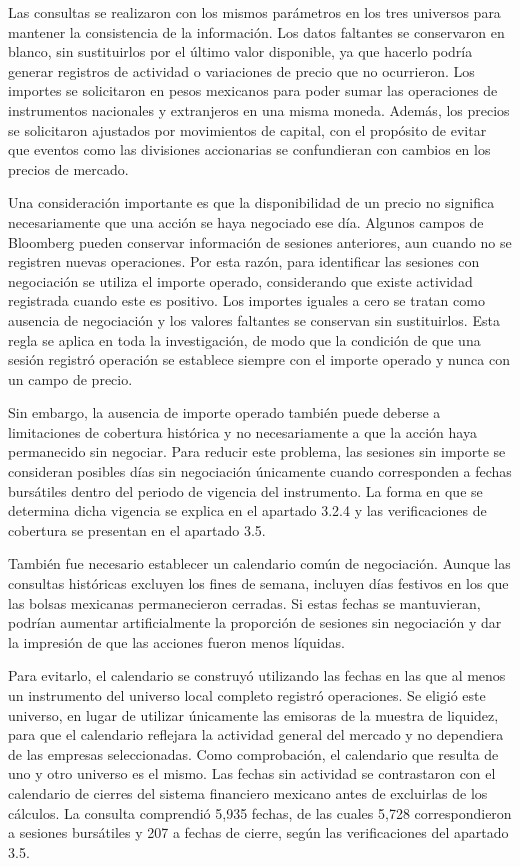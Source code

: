 Las consultas se realizaron con los mismos parámetros en los tres universos para mantener la consistencia de la información. Los datos faltantes se conservaron en blanco, sin sustituirlos por el último valor disponible, ya que hacerlo podría generar registros de actividad o variaciones de precio que no ocurrieron. Los importes se solicitaron en pesos mexicanos para poder sumar las operaciones de instrumentos nacionales y extranjeros en una misma moneda. Además, los precios se solicitaron ajustados por movimientos de capital, con el propósito de evitar que eventos como las divisiones accionarias se confundieran con cambios en los precios de mercado.

Una consideración importante es que la disponibilidad de un precio no significa necesariamente que una acción se haya negociado ese día. Algunos campos de Bloomberg pueden conservar información de sesiones anteriores, aun cuando no se registren nuevas operaciones. Por esta razón, para identificar las sesiones con negociación se utiliza el importe operado, considerando que existe actividad registrada cuando este es positivo. Los importes iguales a cero se tratan como ausencia de negociación y los valores faltantes se conservan sin sustituirlos. Esta regla se aplica en toda la investigación, de modo que la condición de que una sesión registró operación se establece siempre con el importe operado y nunca con un campo de precio.

Sin embargo, la ausencia de importe operado también puede deberse a limitaciones de cobertura histórica y no necesariamente a que la acción haya permanecido sin negociar. Para reducir este problema, las sesiones sin importe se consideran posibles días sin negociación únicamente cuando corresponden a fechas bursátiles dentro del periodo de vigencia del instrumento. La forma en que se determina dicha vigencia se explica en el apartado 3.2.4 y las verificaciones de cobertura se presentan en el apartado 3.5.

También fue necesario establecer un calendario común de negociación. Aunque las consultas históricas excluyen los fines de semana, incluyen días festivos en los que las bolsas mexicanas permanecieron cerradas. Si estas fechas se mantuvieran, podrían aumentar artificialmente la proporción de sesiones sin negociación y dar la impresión de que las acciones fueron menos líquidas.

Para evitarlo, el calendario se construyó utilizando las fechas en las que al menos un instrumento del universo local completo registró operaciones. Se eligió este universo, en lugar de utilizar únicamente las emisoras de la muestra de liquidez, para que el calendario reflejara la actividad general del mercado y no dependiera de las empresas seleccionadas. Como comprobación, el calendario que resulta de uno y otro universo es el mismo. Las fechas sin actividad se contrastaron con el calendario de cierres del sistema financiero mexicano antes de excluirlas de los cálculos. La consulta comprendió 5,935 fechas, de las cuales 5,728 correspondieron a sesiones bursátiles y 207 a fechas de cierre, según las verificaciones del apartado 3.5.

